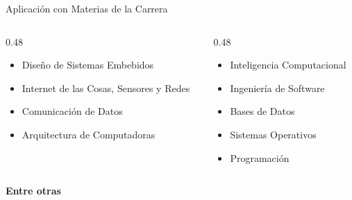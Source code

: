 \documentclass[10pt]{beamer}
\begin{document}
\begin{frame}{Aplicación con Materias de la Carrera}
  \begin{columns}[t]
    \begin{column}{0.48\textwidth}
      \begin{itemize}
        \setlength{\itemsep}{0.8em}
        \item Diseño de Sistemas Embebidos
        \item Internet de las Cosas, Sensores y Redes
        \item Comunicación de Datos
        \item Arquitectura de Computadoras
      \end{itemize}
    \end{column}
    \begin{column}{0.48\textwidth}
      \begin{itemize}
        \setlength{\itemsep}{0.8em}
        \item Inteligencia Computacional
        \item Ingeniería de Software
        \item Bases de Datos
        \item Sistemas Operativos
        \item Programación
      \end{itemize}
    \end{column}
  \end{columns}
  \vspace{1.5em}
  \centering
  \textbf{Entre otras}
\end{frame}
\end{document}
